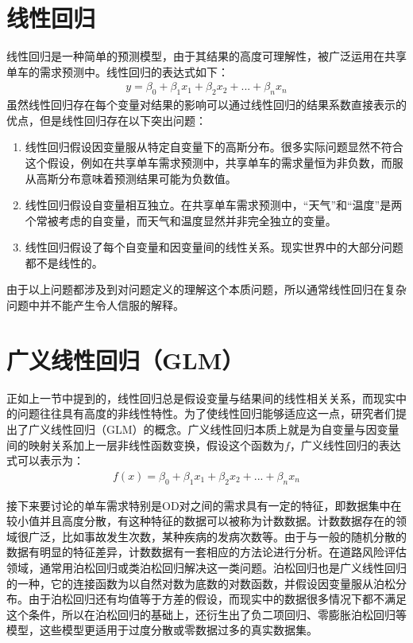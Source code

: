 \documentclass[]{tongjithesis}
\numberwithin{equation}{chapter}
\begin{document}
\section{线性回归}
线性回归是一种简单的预测模型，由于其结果的高度可理解性，被广泛运用在共享单车的需求预测中。线性回归的表达式如下：
\begin{align}
	y = \beta_{0}+\beta_{1}x_{1}+\beta_{2}x_{2}+...+\beta_{n}x_{n}
\end{align}
\noindent
虽然线性回归存在每个变量对结果的影响可以通过线性回归的结果系数直接表示的优点，但是线性回归存在以下突出问题：
\begin{enumerate}
	\item 线性回归假设因变量服从特定自变量下的高斯分布。很多实际问题显然不符合这个假设，例如在共享单车需求预测中，共享单车的需求量恒为非负数，而服从高斯分布意味着预测结果可能为负数值。
	\item 线性回归假设自变量相互独立。在共享单车需求预测中，“天气”和“温度”是两个常被考虑的自变量，而天气和温度显然并非完全独立的变量。
	\item 线性回归假设了每个自变量和因变量间的线性关系。现实世界中的大部分问题都不是线性的。
\end{enumerate}

由于以上问题都涉及到对问题定义的理解这个本质问题，所以通常线性回归在复杂问题中并不能产生令人信服的解释。

\section{广义线性回归（GLM）}
正如上一节中提到的，线性回归总是假设变量与结果间的线性相关关系，而现实中的问题往往具有高度的非线性特性。为了使线性回归能够适应这一点，研究者们提出了广义线性回归（GLM）的概念。广义线性回归本质上就是为自变量与因变量间的映射关系加上一层非线性函数变换，假设这个函数为$f$，广义线性回归的表达式可以表示为：
\begin{align}
	f(x) = \beta_{0}+\beta_{1}x_{1}+\beta_{2}x_{2}+...+\beta_{n}x_{n}
\end{align}

接下来要讨论的单车需求特别是OD对之间的需求具有一定的特征，即数据集中在较小值并且高度分散，有这种特征的数据可以被称为计数数据。计数数据存在的领域很广泛，比如事故发生次数，某种疾病的发病次数等。由于与一般的随机分散的数据有明显的特征差异，计数数据有一套相应的方法论进行分析。在道路风险评估领域，通常用泊松回归或类泊松回归解决这一类问题\cite{mannering2014analytic}。泊松回归也是广义线性回归的一种，它的连接函数为以自然对数为底数的对数函数，并假设因变量服从泊松分布。由于泊松回归还有均值等于方差的假设，而现实中的数据很多情况下都不满足这个条件，所以在泊松回归的基础上，还衍生出了负二项回归、零膨胀泊松回归等模型，这些模型更适用于过度分散或零数据过多的真实数据集。
\end{document}
